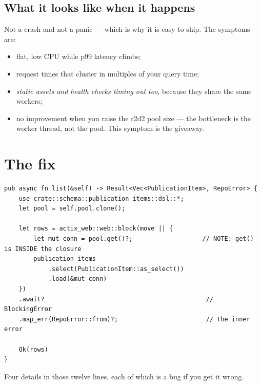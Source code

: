 \subsection{What it looks like when it happens}

Not a crash and not a panic --- which is why it is easy to ship. The symptoms are:

\begin{itemize}
  \item flat, low CPU while p99 latency climbs;
  \item request times that cluster in multiples of your query time;
  \item \emph{static assets and health checks timing out too}, because they share the same
    workers;
  \item no improvement when you raise the r2d2 pool size --- the bottleneck is the worker thread,
    not the pool. This symptom is the giveaway.
\end{itemize}

\section{The fix}

\begin{pattern}
\begin{lstlisting}[style=rs]
pub async fn list(&self) -> Result<Vec<PublicationItem>, RepoError> {
    use crate::schema::publication_items::dsl::*;
    let pool = self.pool.clone();

    let rows = actix_web::web::block(move || {
        let mut conn = pool.get()?;                   // NOTE: get() is INSIDE the closure
        publication_items
            .select(PublicationItem::as_select())
            .load(&mut conn)
    })
    .await?                                            // BlockingError
    .map_err(RepoError::from)?;                        // the inner error

    Ok(rows)
}
\end{lstlisting}
\end{pattern}

Four details in those twelve lines, each of which is a bug if you get it wrong.


